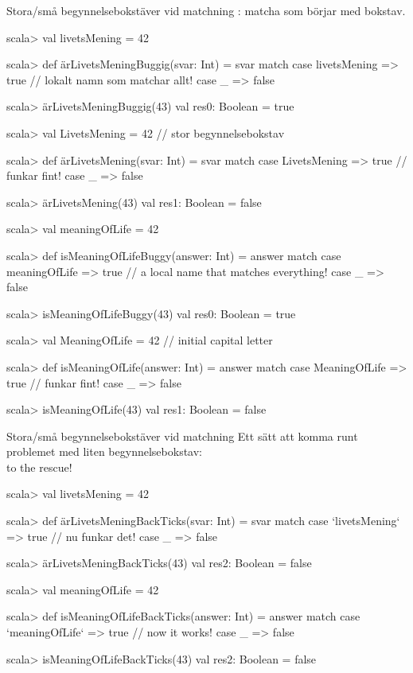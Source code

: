 \begin{Slide}{Stora/små begynnelsebokstäver vid matchning}
: matcha  som börjar med  bokstav.
\ifswedish
\begin{REPL}
scala> val livetsMening = 42

scala> def ärLivetsMeningBuggig(svar: Int) = svar match 
         case livetsMening => true    // lokalt namn som matchar allt!
         case _ => false

scala> ärLivetsMeningBuggig(43)
val res0: Boolean = true

scala> val LivetsMening = 42   // stor begynnelsebokstav

scala> def ärLivetsMening(svar: Int) = svar match 
         case LivetsMening => true    // funkar fint!
         case _ => false

scala> ärLivetsMening(43)
val res1: Boolean = false
\end{REPL}
\else
\begin{REPL}
scala> val meaningOfLife = 42

scala> def isMeaningOfLifeBuggy(answer: Int) = answer match 
         case meaningOfLife => true    // a local name that matches everything!
         case _ => false

scala> isMeaningOfLifeBuggy(43)
val res0: Boolean = true

scala> val MeaningOfLife = 42   // initial capital letter

scala> def isMeaningOfLife(answer: Int) = answer match 
         case MeaningOfLife => true    // funkar fint!
         case _ => false

scala> isMeaningOfLife(43)
val res1: Boolean = false
\end{REPL}
\fi{}
\end{Slide}


\begin{Slide}{Stora/små begynnelsebokstäver vid matchning}
Ett sätt att komma runt problemet med liten begynnelsebokstav: \\
 to the rescue!
\ifswedish
\begin{REPL}
scala> val livetsMening = 42

scala> def ärLivetsMeningBackTicks(svar: Int) = svar match 
         case `livetsMening` => true    // nu funkar det!
         case _ => false

scala> ärLivetsMeningBackTicks(43)
val res2: Boolean = false
\end{REPL}
\else
\begin{REPL}
scala> val meaningOfLife = 42

scala> def isMeaningOfLifeBackTicks(answer: Int) = answer match 
         case `meaningOfLife` => true    // now it works!
         case _ => false

scala> isMeaningOfLifeBackTicks(43)
val res2: Boolean = false
\end{REPL}
\fi{}
\end{Slide}

